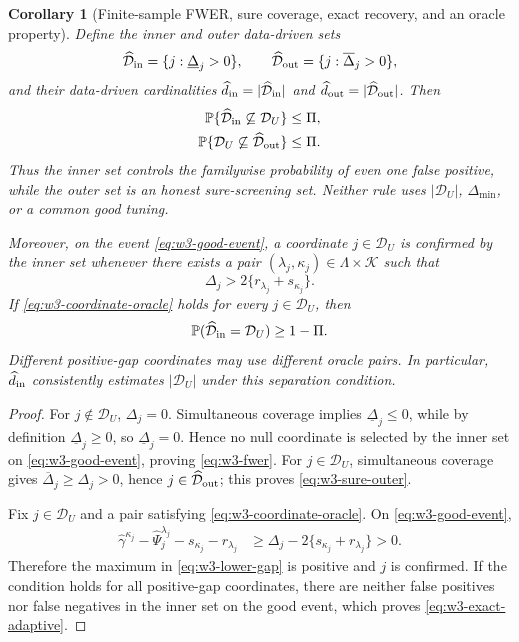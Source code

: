 \documentclass[11pt]{article}
\newtheorem{corollary}[theorem]{Corollary}
\theoremstyle{remark}
\newcommand{\Pp}{\mathbb P}
\newcommand{\DU}{\mathcal D_U}
\begin{document}
\begin{corollary}[Finite-sample FWER, sure coverage, exact recovery, and an oracle property]
\label{cor:w3-fwer-oracle}
Define the inner and outer data-driven sets
\begin{equation}
 \widehat{\mathcal D}_{\rm in}
 =\{j:\underline\Delta_j>0\},
 \qquad
 \widehat{\mathcal D}_{\rm out}
 =\{j:\overline\Delta_j>0\},
 \label{eq:w3-inner-outer}
\end{equation}
and their data-driven cardinalities
$\widehat d_{\rm in}=|\widehat{\mathcal D}_{\rm in}|$ and
$\widehat d_{\rm out}=|\widehat{\mathcal D}_{\rm out}|$.  Then
\begin{align}
 \Pp\{\widehat{\mathcal D}_{\rm in}\not\subseteq\DU\}
 &\le\Pi,
 \label{eq:w3-fwer}\\
 \Pp\{\DU\not\subseteq\widehat{\mathcal D}_{\rm out}\}
 &\le\Pi.
 \label{eq:w3-sure-outer}
\end{align}
Thus the inner set controls the familywise probability of even one false
positive, while the outer set is an honest sure-screening set.  Neither rule
uses $|\DU|$, $\Delta_{\min}$, or a common good tuning.

Moreover, on the event \eqref{eq:w3-good-event}, a coordinate $j\in\DU$ is
confirmed by the inner set whenever there exists a pair
$(\lambda_j,\kappa_j)\in\Lambda\times\mathcal K$ such that
\begin{equation}
 \Delta_j>2\{r_{\lambda_j}+s_{\kappa_j}\}.
 \label{eq:w3-coordinate-oracle}
\end{equation}
If \eqref{eq:w3-coordinate-oracle} holds for every $j\in\DU$, then
\begin{equation}
 \Pp(\widehat{\mathcal D}_{\rm in}=\DU)\ge1-\Pi.
 \label{eq:w3-exact-adaptive}
\end{equation}
Different positive-gap coordinates may use different oracle pairs.  In
particular, $\widehat d_{\rm in}$ consistently estimates $|\DU|$ under this
separation condition.
\end{corollary}

\begin{proof}
For $j\notin\DU$, $\Delta_j=0$.  Simultaneous coverage implies
$\underline\Delta_j\le0$, while by definition
$\underline\Delta_j\ge0$, so $\underline\Delta_j=0$.  Hence no null coordinate
is selected by the inner set on \eqref{eq:w3-good-event}, proving
\eqref{eq:w3-fwer}.  For $j\in\DU$, simultaneous coverage gives
$\overline\Delta_j\ge\Delta_j>0$, hence $j\in\widehat{\mathcal D}_{\rm out}$;
this proves \eqref{eq:w3-sure-outer}.

Fix $j\in\DU$ and a pair satisfying
\eqref{eq:w3-coordinate-oracle}.  On \eqref{eq:w3-good-event},
\begin{align*}
 \widehat\gamma^{\kappa_j}-\widehat\Psi_j^{\lambda_j}
 -s_{\kappa_j}-r_{\lambda_j}
 &\ge
 \Delta_j-2\{s_{\kappa_j}+r_{\lambda_j}\}>0.
\end{align*}
Therefore the maximum in \eqref{eq:w3-lower-gap} is positive and $j$ is
confirmed.  If the condition holds for all positive-gap coordinates, there
are neither false positives nor false negatives in the inner set on the good
event, which proves \eqref{eq:w3-exact-adaptive}.
\end{proof}
\end{document}
